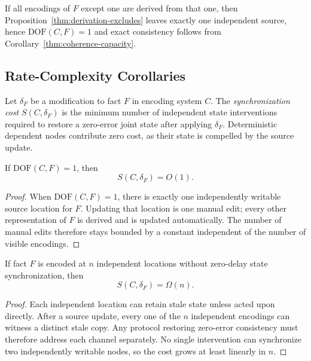 If all encodings of $F$ except one are derived from that one, then Proposition~\ref{thm:derivation-excludes} leaves exactly one independent source, hence $\text{DOF}(C,F)=1$ and exact consistency follows from Corollary~\ref{thm:coherence-capacity}.

\subsection{Rate-Complexity Corollaries}

\begin{definition}\label{def:cost-model}
Let $\delta_F$ be a modification to fact $F$ in encoding system $C$. The \emph{synchronization cost} $S(C,\delta_F)$ is the minimum number of independent state interventions required to restore a zero-error joint state after applying $\delta_F$. Deterministic dependent nodes contribute zero cost, as their state is compelled by the source update.
\end{definition}

\begin{theorem}\label{thm:upper-bound}
If $\text{DOF}(C,F)=1$, then
\[
S(C,\delta_F)=O(1).
\]
\end{theorem}

\begin{proof}
When $\text{DOF}(C,F)=1$, there is exactly one independently writable source location for $F$. Updating that location is one manual edit; every other representation of $F$ is derived and is updated automatically. The number of manual edits therefore stays bounded by a constant independent of the number of visible encodings.
\end{proof}

\begin{theorem}\label{thm:lower-bound}
If fact $F$ is encoded at $n$ independent locations without zero-delay state synchronization, then
\[
S(C,\delta_F)=\Omega(n).
\]
\end{theorem}

\begin{proof}
Each independent location can retain stale state unless acted upon directly. After a source update, every one of the $n$ independent encodings can witness a distinct stale copy. Any protocol restoring zero-error consistency must therefore address each channel separately. No single intervention can synchronize two independently writable nodes, so the cost grows at least linearly in $n$.
\end{proof}

